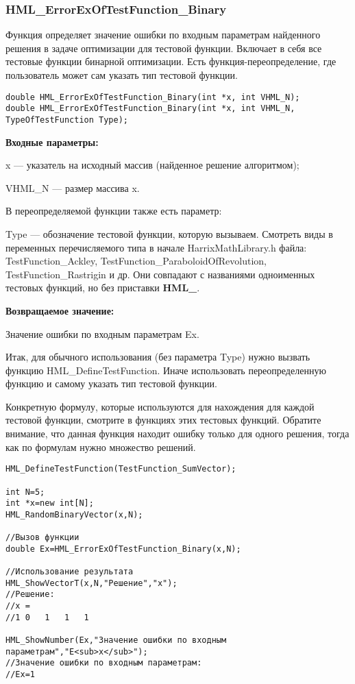 \documentclass[a4paper,12pt]{article}
\begin{document}
\subsubsection{HML\_ErrorExOfTestFunction\_Binary}\label{HML_ErrorExOfTestFunction_Binary}

Функция определяет значение ошибки по входным параметрам найденного решения в задаче оптимизации для тестовой функции. Включает в себя все тестовые функции бинарной оптимизации. Есть функция-переопределение, где пользователь может сам указать тип тестовой функции.


\begin{lstlisting}[label=code_syntax_HML_ErrorExOfTestFunction_Binary,caption=Синтаксис]
double HML_ErrorExOfTestFunction_Binary(int *x, int VHML_N);
double HML_ErrorExOfTestFunction_Binary(int *x, int VHML_N, TypeOfTestFunction Type);
\end{lstlisting}

\textbf{Входные параметры:}

x --- указатель на исходный массив (найденное решение алгоритмом);

VHML\_N --- размер массива x.

В переопределяемой функции также есть параметр:
  
Type --- обозначение тестовой функции, которую вызываем.
Смотреть виды в переменных перечисляемого типа в начале HarrixMathLibrary.h файла: TestFunction\_Ackley, TestFunction\_ParaboloidOfRevolution, TestFunction\_Rastrigin и др. Они совпадают с названиями одноименных тестовых функций, но без приставки \textbf{HML\_}.

\textbf{Возвращаемое значение:}
 
Значение ошибки по входным параметрам Ex.

Итак, для обычного использования (без параметра Type) нужно вызвать функцию HML\_DefineTestFunction. Иначе использовать переопределенную функцию и самому указать тип тестовой функции.

Конкретную формулу, которые используются для нахождения для каждой тестовой функции, смотрите в функциях этих тестовых функций. Обратите внимание, что данная функция находит ошибку только для одного решения, тогда как по формулам нужно множество решений.


\begin{lstlisting}[label=code_use_HML_ErrorExOfTestFunction_Binary,caption=Пример использования]
HML_DefineTestFunction(TestFunction_SumVector);

int N=5;
int *x=new int[N];
HML_RandomBinaryVector(x,N);

//Вызов функции
double Ex=HML_ErrorExOfTestFunction_Binary(x,N);

//Использование результата
HML_ShowVectorT(x,N,"Решение","x");
//Решение:
//x =	
//1	0	1	1	1

HML_ShowNumber(Ex,"Значение ошибки по входным параметрам","E<sub>x</sub>");
//Значение ошибки по входным параметрам:
//Ex=1
\end{lstlisting}
\end{document}
